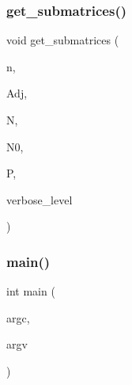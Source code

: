 \mbox{\label{cayley__sym__n_8_c_a8303307ece8025222bb8059632c00b24}} 
\subsubsection{\texorpdfstring{get\+\_\+submatrices()}{get\_submatrices()}}
{\footnotesize\ttfamily void get\+\_\+submatrices (\begin{DoxyParamCaption}\item[{\mbox{\hyperlink{galois_8h_a09fddde158a3a20bd2dcadb609de11dc}{I\+NT}}}]{n,  }\item[{\mbox{\hyperlink{galois_8h_a09fddde158a3a20bd2dcadb609de11dc}{I\+NT}} $\ast$}]{Adj,  }\item[{\mbox{\hyperlink{galois_8h_a09fddde158a3a20bd2dcadb609de11dc}{I\+NT}}}]{N,  }\item[{\mbox{\hyperlink{galois_8h_a09fddde158a3a20bd2dcadb609de11dc}{I\+NT}}}]{N0,  }\item[{\mbox{\hyperlink{galois_8h_a09fddde158a3a20bd2dcadb609de11dc}{I\+NT}} $\ast$$\ast$\&}]{P,  }\item[{\mbox{\hyperlink{galois_8h_a09fddde158a3a20bd2dcadb609de11dc}{I\+NT}}}]{verbose\+\_\+level }\end{DoxyParamCaption})}

\mbox{\label{cayley__sym__n_8_c_a3c04138a5bfe5d72780bb7e82a18e627}} 
\subsubsection{\texorpdfstring{main()}{main()}}
{\footnotesize\ttfamily int main (\begin{DoxyParamCaption}\item[{int}]{argc,  }\item[{char $\ast$$\ast$}]{argv }\end{DoxyParamCaption})}

\mbox{\label{cayley__sym__n_8_c_ae6b2df18f3b650dbe582cd7d172d17cc}} 
